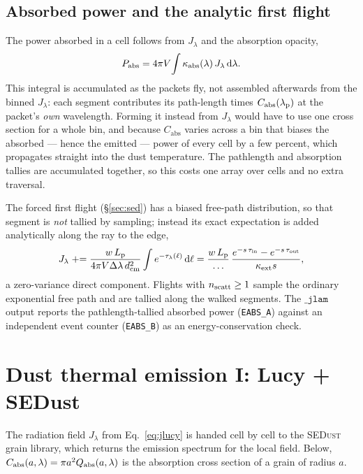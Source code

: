 \documentclass[english,a4paper]{kiseon_memo}
\newcommand{\kabs}{\kappa_{\mathrm{abs}}}
\newcommand{\kext}{\kappa_{\mathrm{ext}}}
\newcommand{\Cabs}{C_{\mathrm{abs}}}
\newcommand{\Jlam}{J_\lambda}
\newcommand{\dd}{\mathrm{d}}
\newcommand{\code}[1]{\texttt{#1}}
\begin{document}
\subsection{Absorbed power and the analytic first flight}
The power absorbed in a cell follows from $\Jlam$ and the absorption opacity,
\begin{equation}
  P_{\rm abs} = 4\pi V \!\int \kabs(\lambda)\,\Jlam \, \dd\lambda .
  \label{eq:pabs}
\end{equation}
This integral is accumulated as the packets fly, not assembled afterwards from
the binned $\Jlam$: each segment contributes its path-length times
$\Cabs(\lambda_{\rm p})$ at the packet's \emph{own} wavelength.  Forming it
instead from $\Jlam$ would have to use one cross section for a whole bin, and
because $\Cabs$ varies across a bin that biases the absorbed --- hence the
emitted --- power of every cell by a few percent, which propagates straight into
the dust temperature.  The pathlength and absorption tallies are accumulated
together, so this costs one array over cells and no extra traversal.

The forced first flight (\S\ref{sec:sed}) has a biased free-path distribution, so
that segment is \emph{not} tallied by sampling; instead its exact expectation is
added analytically along the ray to the edge,
\begin{equation}
  \Jlam \mathrel{+}= \frac{w\,L_{\rm p}}{4\pi V\Delta\lambda\,d_{\rm cm}^2}
     \int e^{-\tau_\lambda(\ell)}\,\dd\ell
   = \frac{w\,L_{\rm p}}{\dots}\,
     \frac{e^{-s\,\tau_{\rm in}}-e^{-s\,\tau_{\rm out}}}{\kext s},
\end{equation}
a zero-variance direct component.  Flights with $n_{\rm scatt}\ge1$ sample the
ordinary exponential free path and are tallied along the walked segments.  The
$\code{\_jlam}$ output reports the pathlength-tallied absorbed power
(\code{EABS\_A}) against an independent event counter (\code{EABS\_B}) as an
energy-conservation check.

\section{Dust thermal emission I: Lucy + SEDust}\label{sec:lucy}

The radiation field $\Jlam$ from Eq.~\eqref{eq:jlucy} is handed cell by cell to
the \textsc{SEDust} grain library, which returns the emission spectrum for the
local field.  Below, $\Cabs(a,\lambda)=\pi a^2 Q_{\rm abs}(a,\lambda)$ is the
absorption cross section of a grain of radius $a$.
\end{document}
